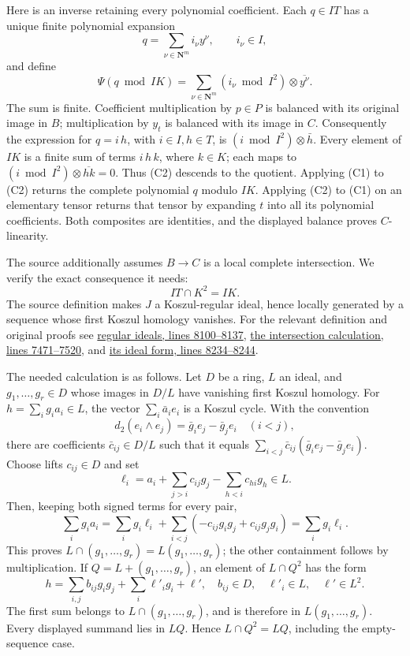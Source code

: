 \documentclass[11pt]{article}
\begin{document}
Here is an inverse retaining every polynomial coefficient. Each \(q\in IT\) has a unique finite polynomial expansion \[
 q=\sum_{\nu\in\mathbf N^m}i_\nu y^\nu,\qquad i_\nu\in I,
\] and define \[
 \Psi(q\bmod IK)=
 \sum_{\nu\in\mathbf N^m}(i_\nu\bmod I^2)\otimes\overline{y^\nu}.
\tag{C2}
\] The sum is finite. Coefficient multiplication by \(p\in P\) is balanced with its original image in \(B\); multiplication by \(y_t\) is balanced with its image in \(C\). Consequently the expression for \(q=i\,h\), with \(i\in I,h\in T\), is \((i\bmod I^2)\otimes\bar h\). Every element of \(IK\) is a finite sum of terms \(i\,h\,k\), where \(k\in K\); each maps to \((i\bmod I^2)\otimes\overline{hk}=0\). Thus (C2) descends to the quotient. Applying (C1) to (C2) returns the complete polynomial \(q\) modulo \(IK\). Applying (C2) to (C1) on an elementary tensor returns that tensor by expanding \(t\) into all its polynomial coefficients. Both composites are identities, and the displayed balance proves \(C\)-linearity.

The source additionally assumes \(B\to C\) is a local complete intersection. We verify the exact consequence it needs: \[
 IT\cap K^2=IK.
\tag{C3}
\] The source definition makes \(J\) a Koszul-regular ideal, hence locally generated by a sequence whose first Koszul homology vanishes. For the relevant definition and original proofs see \href{https://github.com/stacks/stacks-project/blob/a04446e57ec1fbc252a871afcec7752fb2807b14/more-algebra.tex\#L8100}{regular ideals, lines 8100--8137}, \href{https://github.com/stacks/stacks-project/blob/a04446e57ec1fbc252a871afcec7752fb2807b14/more-algebra.tex\#L7471}{the intersection calculation, lines 7471--7520}, and \href{https://github.com/stacks/stacks-project/blob/a04446e57ec1fbc252a871afcec7752fb2807b14/more-algebra.tex\#L8234}{its ideal form, lines 8234--8244}.

The needed calculation is as follows. Let \(D\) be a ring, \(L\) an ideal, and \(g_1,\ldots,g_r\in D\) whose images in \(D/L\) have vanishing first Koszul homology. For \(h=\sum_i g_i a_i\in L\), the vector \(\sum_i\bar a_i e_i\) is a Koszul cycle. With the convention \[
 d_2(e_i\wedge e_j)=\bar g_i e_j-\bar g_j e_i\quad(i<j),
\] there are coefficients \(\bar c_{ij}\in D/L\) such that it equals \(\sum_{i<j}\bar c_{ij}(\bar g_i e_j-\bar g_j e_i)\). Choose lifts \(c_{ij}\in D\) and set \[
 \ell_i=a_i+\sum_{j>i}c_{ij}g_j-\sum_{h<i}c_{hi}g_h\in L.
\] Then, keeping both signed terms for every pair, \[
 \sum_i g_i a_i
 =\sum_i g_i\ell_i+
   \sum_{i<j}(-c_{ij}g_i g_j+c_{ij}g_j g_i)
 =\sum_i g_i\ell_i.
\] This proves \(L\cap(g_1,\ldots,g_r)=L(g_1,\ldots,g_r)\); the other containment follows by multiplication. If \(Q=L+(g_1,\ldots,g_r)\), an element of \(L\cap Q^2\) has the form \[
 h=\sum_{i,j}b_{ij}g_i g_j+\sum_i\ell'_i g_i+\ell',
 \quad b_{ij}\in D,\quad\ell'_i\in L,\quad\ell'\in L^2.
\] The first sum belongs to \(L\cap(g_1,\ldots,g_r)\), and is therefore in \(L(g_1,\ldots,g_r)\). Every displayed summand lies in \(LQ\). Hence \(L\cap Q^2=LQ\), including the empty-sequence case.
\end{document}
